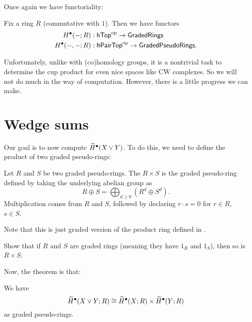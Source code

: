 Once again we have functoriality:
\begin{theorem}
	Fix a ring $R$ (commutative with $1$).
	Then we have functors
	\begin{align*}
		H^\bullet(-; R) &: \mathsf{hTop}^{\mathrm{op}} \to \mathsf{GradedRings} \\
		H^\bullet(-,-; R) &: \mathsf{hPairTop}^{\mathrm{op}} \to \mathsf{GradedPseudoRings}.
	\end{align*}
\end{theorem}

Unfortunately, unlike with (co)homology groups,
it is a nontrivial task to determine the cup product
for even nice spaces like CW complexes.
So we will not do much in the way of computation.
However, there is a little progress we can make.

\section{Wedge sums}
Our goal is to now compute $\widetilde H^\bullet(X \vee Y)$.
To do this, we need to define the product of two graded pseudo-rings:
\begin{definition}
	Let $R$ and $S$ be two graded pseudo-rings.
	The  $R \times S$ is the graded pseudo-ring
	defined by taking the underlying abelian group as 
	\[ R \oplus S = \bigoplus_{d \ge 0} (R^d \oplus S^d). \]
	Multiplication comes from $R$ and $S$, followed by
	declaring $r \cdot s = 0$ for $r \in R$, $s \in S$.
\end{definition}
Note that this is just graded version of the product ring
defined in .
\begin{exercise}
	Show that if $R$ and $S$ are graded rings (meaning they have $1_R$ and $1_S$),
	then so is $R \times S$.
\end{exercise}

Now, the theorem is that:
\begin{theorem}
	We have
	\[
		\widetilde H^\bullet(X \vee Y; R)
		\cong \widetilde H^\bullet(X;R)
		\times \widetilde H^\bullet(Y;R)
	\]
	as graded pseudo-rings.
\end{theorem}


